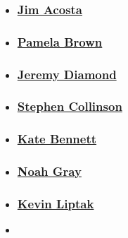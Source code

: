 \begin{itemize}
\item
  \hypertarget{jim-acosta}{%
  \subsubsection{\texorpdfstring{\href{/profiles/jim-acosta-profile}{Jim
  Acosta}}{Jim Acosta}}\label{jim-acosta}}
\item
  \hypertarget{pamela-brown}{%
  \subsubsection{\texorpdfstring{\href{/profiles/pamela-brown-profile}{Pamela
  Brown}}{Pamela Brown}}\label{pamela-brown}}
\item
  \hypertarget{jeremy-diamond}{%
  \subsubsection{\texorpdfstring{\href{/profiles/jeremy-diamond}{Jeremy
  Diamond}}{Jeremy Diamond}}\label{jeremy-diamond}}
\item
  \hypertarget{stephen-collinson}{%
  \subsubsection{\texorpdfstring{\href{/profiles/stephen-collinson}{Stephen
  Collinson}}{Stephen Collinson}}\label{stephen-collinson}}
\item
  \hypertarget{kate-bennett}{%
  \subsubsection{\texorpdfstring{\href{/profiles/kate-bennett}{Kate
  Bennett}}{Kate Bennett}}\label{kate-bennett}}
\item
  \hypertarget{noah-gray-}{%
  \subsubsection{\texorpdfstring{\href{/profiles/noah-gray}{Noah Gray
  }}{Noah Gray }}\label{noah-gray-}}
\item
  \hypertarget{kevin-liptak}{%
  \subsubsection{\texorpdfstring{\href{/profiles/kevin-liptak-profile}{Kevin
  Liptak}}{Kevin Liptak}}\label{kevin-liptak}}
\item
  \hypertarget{allie-malloy}{%
}
\end{itemize}
